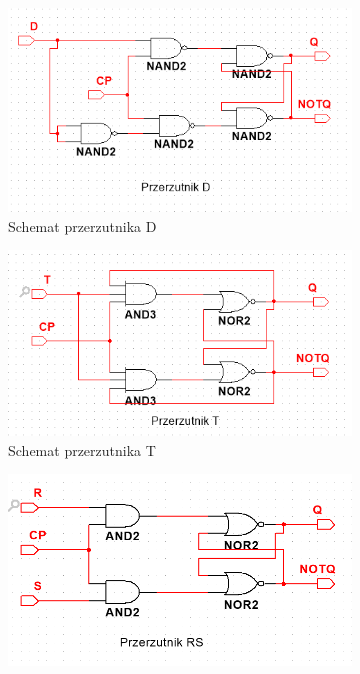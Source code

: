 \documentclass{article}
\begin{document}
\begin{figure}[h]
    \centering
    \begin{subfigure}[t]{0.3\textwidth}
        \centering
        \includegraphics[width=\textwidth]{D.png}
        \caption{Schemat przerzutnika D}
    \end{subfigure}
    \hfill
    \begin{subfigure}[t]{0.3\textwidth}
        \centering
        \includegraphics[width=\textwidth]{T.png}
        \caption{Schemat przerzutnika T}
    \end{subfigure}
    \hfill
    \begin{subfigure}[t]{0.3\textwidth}
        \centering
        \includegraphics[width=\textwidth]{RS.png}

\end{subfigure}
\end{figure}
\end{document}
